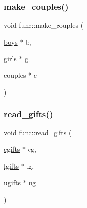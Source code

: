 \subsubsection{\texorpdfstring{make\+\_\+couples()}{make\_couples()}}
{\footnotesize\ttfamily void func\+::make\+\_\+couples (\begin{DoxyParamCaption}\item[{\hyperlink{classinfo_1_1boys}{boys} $\ast$}]{b,  }\item[{\hyperlink{classinfo_1_1girls}{girls} $\ast$}]{g,  }\item[{couples $\ast$}]{c }\end{DoxyParamCaption})}

\mbox{\label{namespacefunc_a014bc428ac2cf6930dbc224ae4e25829}} 
\subsubsection{\texorpdfstring{read\+\_\+gifts()}{read\_gifts()}}
{\footnotesize\ttfamily void func\+::read\+\_\+gifts (\begin{DoxyParamCaption}\item[{\hyperlink{classinfo_1_1egifts}{egifts} $\ast$}]{eg,  }\item[{\hyperlink{classinfo_1_1lgifts}{lgifts} $\ast$}]{lg,  }\item[{\hyperlink{classinfo_1_1ugifts}{ugifts} $\ast$}]{ug }\end{DoxyParamCaption})}

